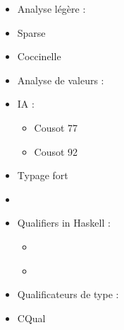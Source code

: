 \begin{itemize}
\item
  Analyse légère :
\item
  Sparse \cite{TorvaldsSparse}
\item
  Coccinelle
\item
  Analyse de valeurs :
\item
  IA :
  \begin{itemize}
  \item
    Cousot 77 \cite{Cousot77}
  \item
    Cousot 92 \cite{Cousot92-1}
  \end{itemize}
\item
  Typage fort
\item
  \cite{TAPL}
\item
  Qualifiers in Haskell :
  \begin{itemize}
  \item
    \cite{lightweight-static-capabilities}
  \item
    \cite{LZ06a}
  \end{itemize}
\item
  Qualificateurs de type :
\item
  CQual \cite{pldi99,usenix01,pldi02,cquk-usenix04,toplas-quals}
\end{itemize}
